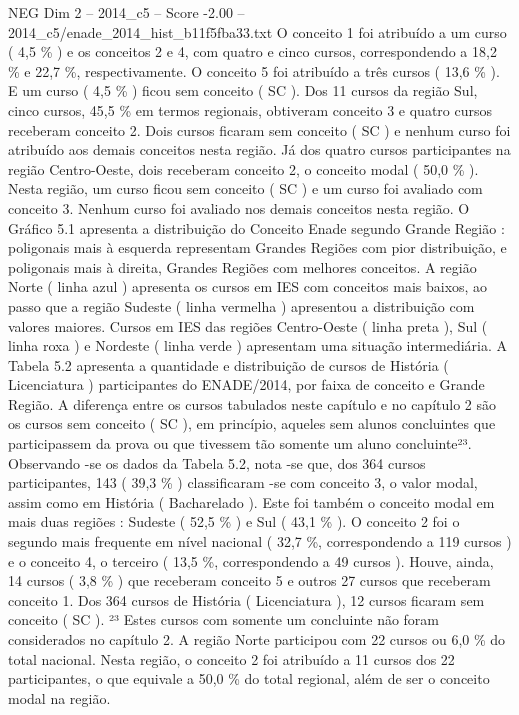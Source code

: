 \begin{textsample}{NEG Dim 2 – 2014\_c5 – Score -2.00 – 2014\_c5/enade\_2014\_hist\_b11f5fba33.txt}
O conceito 1 foi atribuído a um curso ( 4,5 \% ) e os conceitos 2 e 4, com quatro e cinco cursos, correspondendo a 18,2 \% e 22,7 \%, respectivamente.
O conceito 5 foi atribuído a três cursos ( 13,6 \% ).
E um curso ( 4,5 \% ) ficou sem conceito ( SC ).
Dos 11 cursos da região Sul, cinco cursos, 45,5 \% em termos regionais, obtiveram conceito 3 e quatro cursos receberam conceito 2.
Dois cursos ficaram sem conceito ( SC ) e nenhum curso foi atribuído aos demais conceitos nesta região.
Já dos quatro cursos participantes na região Centro-Oeste, dois receberam conceito 2, o conceito modal ( 50,0 \% ).
Nesta região, um curso ficou sem conceito ( SC ) e um curso foi avaliado com conceito 3.
Nenhum curso foi avaliado nos demais conceitos nesta região.
O Gráfico 5.1 apresenta a distribuição do Conceito Enade segundo Grande Região : poligonais mais à esquerda representam Grandes Regiões com pior distribuição, e poligonais mais à direita, Grandes Regiões com melhores conceitos.
A região Norte ( linha azul ) apresenta os cursos em IES com conceitos mais baixos, ao passo que a região Sudeste ( linha vermelha ) apresentou a distribuição com valores maiores.
Cursos em IES das regiões Centro-Oeste ( linha preta ), Sul ( linha roxa ) e Nordeste ( linha verde ) apresentam uma situação intermediária.
A Tabela 5.2 apresenta a quantidade e distribuição de cursos de História ( Licenciatura ) participantes do ENADE/2014, por faixa de conceito e Grande Região.
A diferença entre os cursos tabulados neste capítulo e no capítulo 2 são os cursos sem conceito ( SC ), em princípio, aqueles sem alunos concluintes que participassem da prova ou que tivessem tão somente um aluno concluinte²³.
Observando -se os dados da Tabela 5.2, nota -se que, dos 364 cursos participantes, 143 ( 39,3 \% ) classificaram -se com conceito 3, o valor modal, assim como em História ( Bacharelado ).
Este foi também o conceito modal em mais duas regiões : Sudeste ( 52,5 \% ) e Sul ( 43,1 \% ).
O conceito 2 foi o segundo mais frequente em nível nacional ( 32,7 \%, correspondendo a 119 cursos ) e o conceito 4, o terceiro ( 13,5 \%, correspondendo a 49 cursos ).
Houve, ainda, 14 cursos ( 3,8 \% ) que receberam conceito 5 e outros 27 cursos que receberam conceito 1.
Dos 364 cursos de História ( Licenciatura ), 12 cursos ficaram sem conceito ( SC ). ²³ Estes cursos com somente um concluinte não foram considerados no capítulo 2.
A região Norte participou com 22 cursos ou 6,0 \% do total nacional.
Nesta região, o conceito 2 foi atribuído a 11 cursos dos 22 participantes, o que equivale a 50,0 \% do total regional, além de ser o conceito modal na região.

\end{textsample}
